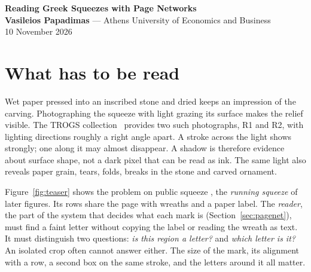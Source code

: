 \documentclass[11pt]{article}
\newcommand{\Rone}{\textsf{R1}}
\newcommand{\Rtwo}{\textsf{R2}}
\begin{document}
\begin{center}
  {\LARGE\bfseries Reading Greek Squeezes with Page Networks}\\[8pt]
  {\small\textbf{Vasileios Papadimas} --- Athens University of Economics and Business}\\[4pt]
  {\small 10 November 2026}
\end{center}

\begin{abstract}
\noindent A paper squeeze records an inscription as an impression of the carved stone. Its letters appear
in light and shadow, alongside folds, cracks and ornament. We describe a system that reads two photographs
of a squeeze, lit from different directions. It aligns the photographs, combines the visible strokes, and
reads each possible letter together with the marks around it. Models of Greek letter sequences help choose
between uncertain readings; they cannot fill a gap where no letter was detected. Five versions of the
processing chain produce transcripts that are aligned and voted on. We follow the images through these
steps and show both successful readings and remaining errors. The character error rate on confidently
annotated text is \DevNestedCer{} on 224 public squeezes, with each squeeze held out from its reader's training
and from the choice of its weights, and \DevTrogsCer{} for the fixed final output on 50 TROGS-26 test squeezes.
\end{abstract}

\section{What has to be read}
\label{sec:task}
Wet paper pressed into an inscribed stone and dried keeps an impression of the carving. Photographing the
squeeze with light grazing its surface makes the relief visible. The TROGS collection~\cite{howe2025} provides
two such photographs, \Rone{} and \Rtwo{}, with lighting directions roughly a right angle apart. A stroke
across the light shows strongly; one along it may almost disappear. A shadow is therefore evidence about
surface shape, not a dark pixel that can be read as ink. The same light also reveals paper grain, tears,
folds, breaks in the stone and carved ornament.

Figure~\ref{fig:teaser} shows the problem on public squeeze \TeaserSqueeze{}, the \emph{running squeeze}
of later figures. Its rows share the page with wreaths and a paper label. The \emph{reader}, the part of
the system that decides what each mark is (Section~\ref{sec:pagenet}), must find a faint letter without
copying the label or reading the wreath as text.
It must distinguish two questions: \emph{is this region a letter?} and \emph{which letter is it?}
An isolated crop often cannot answer either. The size of the mark, its alignment with a row, a second box
on the same stroke, and the letters around it all matter.
\end{document}
